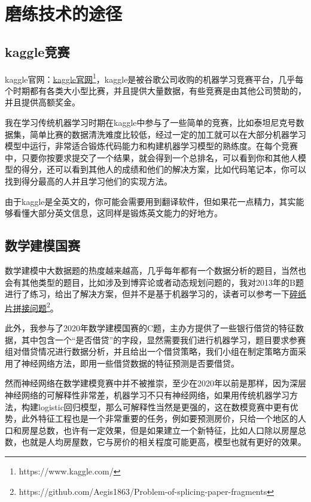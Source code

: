 \documentclass[a5paper, 11pt, openany]{book}
\begin{document}
\chapter{磨练技术的途径}

\section{kaggle竞赛}

kaggle官网：\href{https://www.kaggle.com/}{kaggle官网}\footnote{https://www.kaggle.com/}，kaggle是被谷歌公司收购的机器学习竞赛平台，几乎每个时期都有各类大小型比赛，并且提供大量数据，有些竞赛是由其他公司赞助的，并且提供高额奖金。

我在学习传统机器学习时期在kaggle中参与了一些简单的竞赛，比如泰坦尼克号数据集，简单比赛的数据清洗难度比较低，经过一定的加工就可以在大部分机器学习模型中运行，非常适合锻炼代码能力和构建机器学习模型的熟练度。在每个竞赛中，只要你按要求提交了一个结果，就会得到一个总排名，可以看到你和其他人模型的得分，还可以看到其他人的成绩和他们的解决方案，比如代码笔记本，你可以找到得分最高的人并且学习他们的实现方法。

由于kaggle是全英文的，你可能会需要用到翻译软件，但如果花一点精力，其实能够看懂大部分英文信息，这同样是锻炼英文能力的好地方。

\section{数学建模国赛}

数学建模中大数据题的热度越来越高，几乎每年都有一个数据分析的题目，当然也会有其他类型的题目，比如涉及到博弈论或者动态规划问题的，我对2013年的B题进行了练习，给出了解决方案，但并不是基于机器学习的，读者可以参考一下\href{https://github.com/Aegis1863/Problem-of-splicing-paper-fragments}{碎纸片拼接问题}\footnote{https://github.com/Aegis1863/Problem-of-splicing-paper-fragments}。

此外，我参与了2020年数学建模国赛的C题，主办方提供了一些银行借贷的特征数据，其中包含一个“是否借贷”的字段，显然需要我们进行机器学习，题目要求参赛组对借贷情况进行数据分析，并且给出一个借贷策略，我们小组在制定策略方面采用了神经网络方法，即用一些借贷数据的特征预测是否要借贷。

然而神经网络在数学建模竞赛中并不被推崇，至少在2020年以前是那样，因为深层神经网络的可解释性非常差，机器学习不只有神经网络，如果用传统机器学习方法，构建logistic回归模型，那么可解释性当然是更强的，这在数模竞赛中更有优势，此外特征工程也是一个非常重要的任务，例如要预测房价，只给一个地区的人口和房屋总数，也许有一定效果，但是如果建立一个新特征，比如人口除以房屋总数，也就是人均房屋数，它与房价的相关程度可能更高，模型也就有更好的效果。
\end{document}
